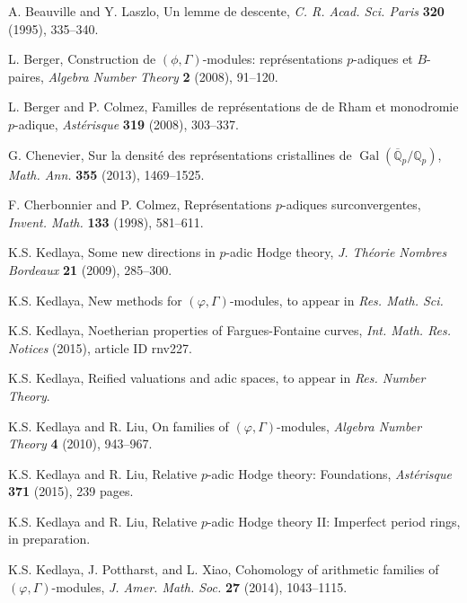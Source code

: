 \documentclass[12pt]{amsart}
\theoremstyle{definition}
\numberwithin{equation}{theorem}
\newcommand{\QQ}{\mathbb{Q}}
\DeclareMathOperator{\Gal}{Gal}
\begin{document}
\begin{thebibliography}{99}

A. Beauville and Y. Laszlo, Un lemme de descente, \textit{C. R. Acad. Sci. Paris} \textbf{320} (1995), 335--340.

L. Berger, Construction de $(\phi, \Gamma)$-modules: repr\'esentations $p$-adiques et $B$-paires, \textit{Algebra Number Theory} \textbf{2} (2008), 91--120.

L. Berger and P. Colmez, Familles de repr\'esentations de de Rham et monodromie $p$-adique, \textit{Ast\'erisque} \textbf{319} (2008), 303--337.

G. Chenevier, Sur la densit\'e des repr\'esentations cristallines de
$\Gal(\overline{\QQ}_p/\QQ_p)$, \textit{Math. Ann.} \textbf{355} (2013), 1469--1525.

F. Cherbonnier and P. Colmez, Repr\'esentations $p$-adiques surconvergentes,
\textit{Invent. Math.} \textbf{133} (1998), 581--611.

K.S. Kedlaya, Some new directions in $p$-adic Hodge theory, \textit{J. Th\'eorie Nombres Bordeaux} \textbf{21} (2009), 285--300.

K.S. Kedlaya, New methods for $(\varphi, \Gamma)$-modules,
to appear in \textit{Res. Math. Sci.}

K.S. Kedlaya, Noetherian properties of Fargues-Fontaine curves,
\textit{Int. Math. Res. Notices} (2015), article ID rnv227. 

K.S. Kedlaya, Reified valuations and adic spaces, to appear in \textit{Res. Number Theory}.

K.S. Kedlaya and R. Liu, On families of $(\varphi, \Gamma)$-modules,
\textit{Algebra Number Theory} \textbf{4} (2010), 943--967.

K.S. Kedlaya and R. Liu, Relative $p$-adic Hodge theory: Foundations,
\textit{Ast\'erisque} \textbf{371} (2015), 239 pages. 

K.S. Kedlaya and R. Liu, Relative $p$-adic Hodge theory II: Imperfect period rings,
in preparation.

K.S. Kedlaya, J. Pottharst, and L. Xiao, Cohomology of arithmetic families of $(\varphi, \Gamma)$-modules, \textit{J. Amer. Math. Soc.}  \textbf{27} (2014), 1043--1115. 


\end{thebibliography}
\end{document}
